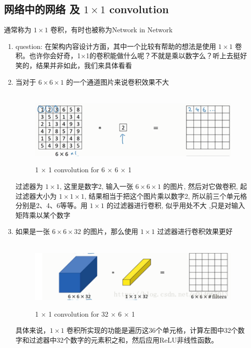 \documentclass[12pt]{ctexart}%
\begin{document}
		\subsection{\quad 网络中的网络 及 $1 \times 1$ convolution}
			通常称为 $1×1$ 卷积，有时也被称为Network in Network
			\begin{enumerate}
				\item question: 在架构内容设计方面，其中一个比较有帮助的想法是使用 $1 \times 1$ 卷积。也许你会好奇，1×1的卷积能做什么呢？不就是乘以数字么？听上去挺好笑的，结果并非如此，我们来具体看看
				
				\item 当对于 $6 \times 6 \times 1$ 的一个通道图片来说卷积效果不大
						\begin{figure}[H]
							\vspace{-0.2cm}  %
							\setlength{\abovecaptionskip}{-0.2cm}   %
							\centering
							\includegraphics[scale=0.6]{for_6_6_1.png}
							\renewcommand{\figurename}{Fig} %
							\caption{1 $\times$ 1 convolution for 6 $\times$ 6 $\times$ 1}
							\label{fig8: for 6 6 1}
						\end{figure}
						过滤器为 $1\times 1$, 这里是数字2, 输入一张 $6 \times 6 \times 1$ 的图片, 然后对它做卷积, 起过滤器大小为 $1 \times 1 \times 1$, 结果相当于把这个图片乘以数字2, 所以前三个单元格分别是2、4、6等等。用 $1 \times 1$ 的过滤器进行卷积, 似乎用处不大 ,只是对输入矩阵乘以某个数字
								
				\item 如果是一张 $6\times 6\times 32$ 的图片，那么使用 $1\times 1$ 过滤器进行卷积效果更好
						\begin{figure}[H]
							\vspace{-0.2cm}  %
							\setlength{\abovecaptionskip}{-0.2cm}   %
							\centering
							\includegraphics[scale=0.6]{for_6_6_32.png}
							\renewcommand{\figurename}{Fig} %
							\caption{1 $\times$ 1 convolution for 32 $\times$ 6 $\times$ 1}
							\label{fig9: for 6 6 32}
						\end{figure}
					具体来说，$1 \times 1$ 卷积所实现的功能是遍历这36个单元格，计算左图中32个数字和过滤器中32个数字的元素积之和，然后应用ReLU非线性函数。
					

\end{enumerate}
\end{document}
